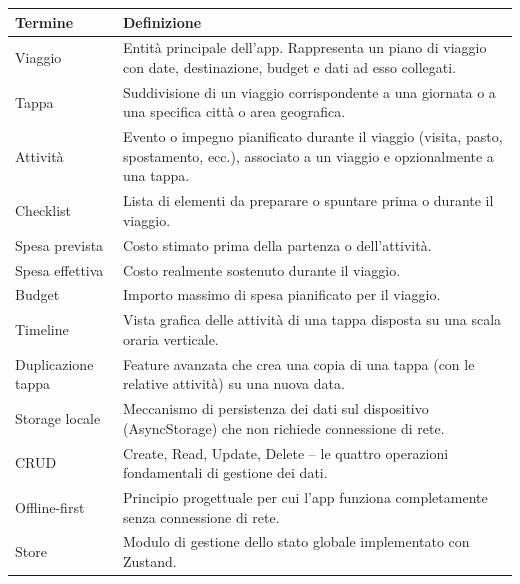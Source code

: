 \documentclass[12pt, a4paper]{article}
\begin{document}
\begin{tabular}{@{}p{3.5cm}p{10.5cm}@{}}
  \toprule
  \textbf{Termine} & \textbf{Definizione} \\
  \midrule
  Viaggio & Entità principale dell'app. Rappresenta un piano di viaggio con date, destinazione, budget e dati ad esso collegati. \\
  Tappa & Suddivisione di un viaggio corrispondente a una giornata o a una specifica città o area geografica. \\
  Attività & Evento o impegno pianificato durante il viaggio (visita, pasto, spostamento, ecc.), associato a un viaggio e opzionalmente a una tappa. \\
  Checklist & Lista di elementi da preparare o spuntare prima o durante il viaggio. \\
  Spesa prevista & Costo stimato prima della partenza o dell'attività. \\
  Spesa effettiva & Costo realmente sostenuto durante il viaggio. \\
  Budget & Importo massimo di spesa pianificato per il viaggio. \\
  Timeline & Vista grafica delle attività di una tappa disposta su una scala oraria verticale. \\
  Duplicazione tappa & Feature avanzata che crea una copia di una tappa (con le relative attività) su una nuova data. \\
  Storage locale & Meccanismo di persistenza dei dati sul dispositivo (AsyncStorage) che non richiede connessione di rete. \\
  CRUD & Create, Read, Update, Delete -- le quattro operazioni fondamentali di gestione dei dati. \\
  Offline-first & Principio progettuale per cui l'app funziona completamente senza connessione di rete. \\
  Store & Modulo di gestione dello stato globale implementato con Zustand. \\
  \bottomrule
\end{tabular}
\end{document}
